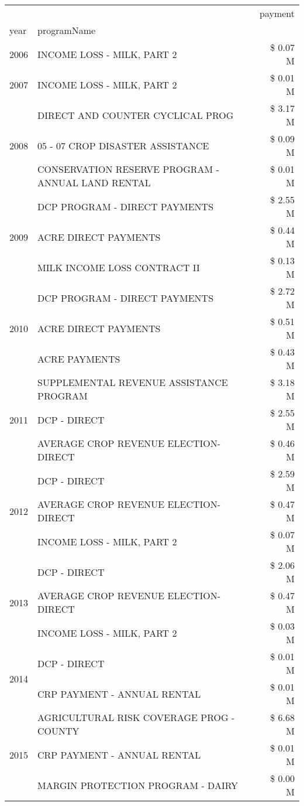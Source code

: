 \begin{tabular}{llr}
\toprule
 &  & payment \\
year & programName &  \\
\midrule
2006 & INCOME LOSS - MILK, PART 2 & \$ 0.07 M \\
\cline{1-3}
2007 & INCOME LOSS - MILK, PART 2 & \$ 0.01 M \\
\cline{1-3}
\multirow[t]{3}{*}{2008} & DIRECT AND COUNTER CYCLICAL PROG & \$ 3.17 M \\
 & 05 - 07 CROP DISASTER ASSISTANCE & \$ 0.09 M \\
 & CONSERVATION RESERVE PROGRAM - ANNUAL LAND RENTAL & \$ 0.01 M \\
\cline{1-3}
\multirow[t]{3}{*}{2009} & DCP PROGRAM - DIRECT PAYMENTS & \$ 2.55 M \\
 & ACRE DIRECT PAYMENTS & \$ 0.44 M \\
 & MILK INCOME LOSS CONTRACT II & \$ 0.13 M \\
\cline{1-3}
\multirow[t]{3}{*}{2010} & DCP PROGRAM - DIRECT PAYMENTS & \$ 2.72 M \\
 & ACRE DIRECT PAYMENTS & \$ 0.51 M \\
 & ACRE PAYMENTS & \$ 0.43 M \\
\cline{1-3}
\multirow[t]{3}{*}{2011} & SUPPLEMENTAL REVENUE ASSISTANCE PROGRAM & \$ 3.18 M \\
 & DCP - DIRECT & \$ 2.55 M \\
 & AVERAGE CROP REVENUE ELECTION-DIRECT & \$ 0.46 M \\
\cline{1-3}
\multirow[t]{3}{*}{2012} & DCP - DIRECT & \$ 2.59 M \\
 & AVERAGE CROP REVENUE ELECTION-DIRECT & \$ 0.47 M \\
 & INCOME LOSS - MILK, PART 2 & \$ 0.07 M \\
\cline{1-3}
\multirow[t]{3}{*}{2013} & DCP - DIRECT & \$ 2.06 M \\
 & AVERAGE CROP REVENUE ELECTION-DIRECT & \$ 0.47 M \\
 & INCOME LOSS - MILK, PART 2 & \$ 0.03 M \\
\cline{1-3}
\multirow[t]{2}{*}{2014} & DCP - DIRECT & \$ 0.01 M \\
 & CRP PAYMENT - ANNUAL RENTAL & \$ 0.01 M \\
\cline{1-3}
\multirow[t]{3}{*}{2015} & AGRICULTURAL RISK COVERAGE PROG - COUNTY & \$ 6.68 M \\
 & CRP PAYMENT - ANNUAL RENTAL & \$ 0.01 M \\
 & MARGIN PROTECTION PROGRAM - DAIRY & \$ 0.00 M \\

\end{tabular}
